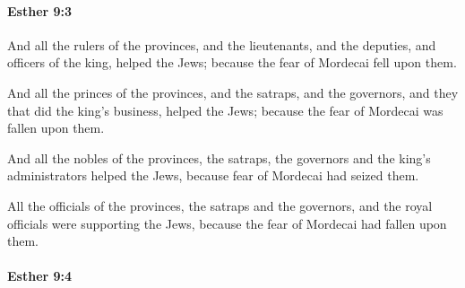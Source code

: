 		\paragraph{Esther 9:3} %
			\label{ESTHER-9-3}

			And all the rulers of the provinces, and the lieutenants, and the deputies, and officers of the king, helped the Jews; because the fear of Mordecai fell upon them.

			\begin{versebox}
					\item[BHS] 
					\item[LXX] 
					\item[ASV] And all the princes of the provinces, and the satraps, and the governors, and they that did the king's business, helped the Jews; because the fear of Mordecai was fallen upon them.
					\item[NIV] And all the nobles of the provinces, the satraps, the governors and the king’s administrators helped the Jews, because fear of Mordecai had seized them.
					\item[NRSV] All the officials of the provinces, the satraps and the governors, and the royal officials were supporting the Jews, because the fear of Mordecai had fallen upon them.
			\end{versebox}

		\paragraph{Esther 9:4} %
			\label{ESTHER-9-4}

